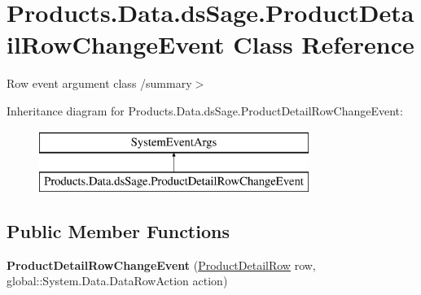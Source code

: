 \hypertarget{class_products_1_1_data_1_1ds_sage_1_1_product_detail_row_change_event}{}\section{Products.\+Data.\+ds\+Sage.\+Product\+Detail\+Row\+Change\+Event Class Reference}
\label{class_products_1_1_data_1_1ds_sage_1_1_product_detail_row_change_event}


Row event argument class /summary$>$  


Inheritance diagram for Products.\+Data.\+ds\+Sage.\+Product\+Detail\+Row\+Change\+Event\+:\begin{figure}[H]
\begin{center}
\leavevmode
\includegraphics[height=2.000000cm]{class_products_1_1_data_1_1ds_sage_1_1_product_detail_row_change_event}
\end{center}
\end{figure}
\subsection*{Public Member Functions}
\begin{DoxyCompactItemize}
\item 
{\bfseries Product\+Detail\+Row\+Change\+Event} (\hyperlink{class_products_1_1_data_1_1ds_sage_1_1_product_detail_row}{Product\+Detail\+Row} row, global\+::\+System.\+Data.\+Data\+Row\+Action action)\hypertarget{class_products_1_1_data_1_1ds_sage_1_1_product_detail_row_change_event_aa5c2f36d5ed9e7331f65d9e9b142a136}{}\label{class_products_1_1_data_1_1ds_sage_1_1_product_detail_row_change_event_aa5c2f36d5ed9e7331f65d9e9b142a136}

\end{DoxyCompactItemize}
